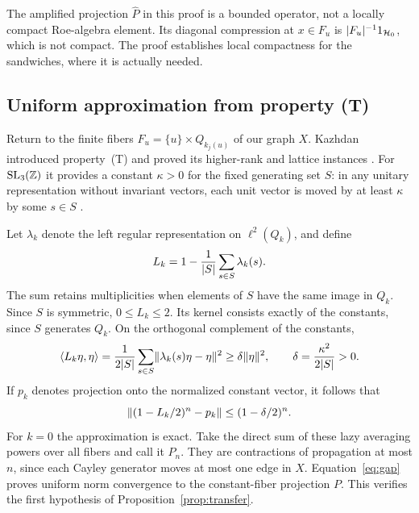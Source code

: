 The amplified projection $\widehat P$ in this proof is a bounded operator,
not a locally compact Roe-algebra element. Its diagonal compression at
$x\in F_u$ is $\lvert F_u\rvert^{-1}1_{\mathcal H_0}$, which is not compact.
The proof establishes local compactness for the sandwiches, where it is
actually needed.

\subsection{Uniform approximation from property (T)}
Return to the finite fibers $F_u=\{u\}\times Q_{k_j(u)}$ of our graph $X$.
Kazhdan introduced property~(T) and proved its higher-rank and lattice
instances \cite{Kazhdan}. For $\operatorname{SL}_3(\mathbb Z)$ it provides
a constant $\kappa>0$ for the fixed
generating set $S$: in any unitary representation without invariant vectors,
each unit vector is moved by at least $\kappa$ by some $s\in S$
\cite[Proposition~1.3.2 and Example~1.7.4]{BHV}.

Let $\lambda_k$ denote the left regular representation on $\ell^2(Q_k)$,
and define
\[
 L_k=1-\frac1{\lvert S\rvert}\sum_{s\in S}\lambda_k(s).
\]
The sum retains multiplicities when elements of $S$ have the same image
in $Q_k$. Since $S$ is symmetric, $0\le L_k\le2$. Its kernel consists
exactly of the constants, since $S$ generates $Q_k$. On the orthogonal
complement of the constants,
\[
 \langle L_k\eta,\eta\rangle
 =\frac1{2\lvert S\rvert}\sum_{s\in S}\lVert \lambda_k(s)\eta-\eta\rVert^2
 \ge\delta\lVert \eta\rVert^2,\qquad \delta=\frac{\kappa^2}{2\lvert S\rvert}>0.
\]
If $p_k$ denotes projection onto the normalized constant vector, it follows
that
\begin{equation}\label{eq:gap}
 \lVert (1-L_k/2)^n-p_k\rVert\le(1-\delta/2)^n.
\end{equation}
For $k=0$ the approximation is exact. Take the direct sum of these lazy
averaging powers over all fibers and call it $P_n$. They are contractions
of propagation at most $n$, since each Cayley generator moves at most one
edge in $X$. Equation~\eqref{eq:gap} proves uniform norm convergence to
the constant-fiber projection $P$. This verifies the first hypothesis of
Proposition~\ref{prop:transfer}.

